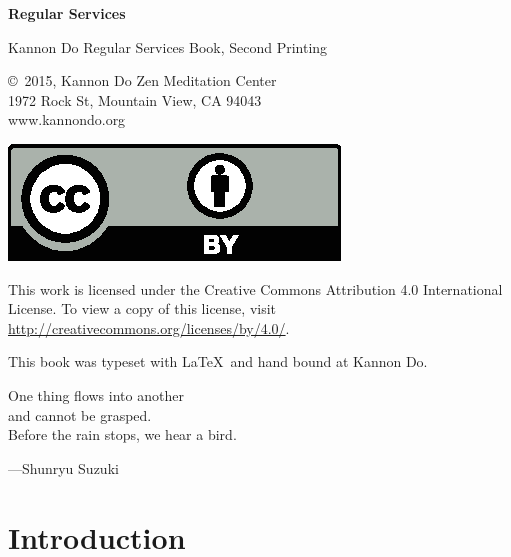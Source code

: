 \documentclass{chantbook}
\begin{document}

\frontmatter
\begin{titlepage}
{\Huge\bf Regular Services}
\end{titlepage}

\begin{colophon}
Kannon Do Regular Services Book, Second Printing

\bigskip

\copyright\ 2015, Kannon Do Zen Meditation Center\\
1972 Rock St, Mountain View, CA 94043\\
www.kannondo.org

\includegraphics{by}

This work is licensed under the Creative Commons Attribution 4.0 International
License. To view a copy of this license, visit
\url{http://creativecommons.org/licenses/by/4.0/}.

\bigskip

This book was typeset with \LaTeX\ and hand bound at Kannon Do.
\end{colophon}

\begin{dedication}
One thing flows into another\\
and cannot be grasped.\\
Before the rain stops, we hear a bird.

---Shunryu Suzuki
\end{dedication}

\cleardoublepage

\tableofcontents

\mainmatter

\chapter{Introduction}
\end{document}
